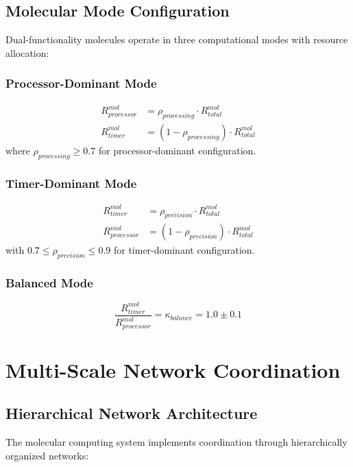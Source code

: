 \documentclass[12pt,a4paper]{article}
\begin{document}
\subsection{Molecular Mode Configuration}

Dual-functionality molecules operate in three computational modes with resource allocation:

\subsubsection{Processor-Dominant Mode}
\begin{align}
R_{processor}^{mol} &= \rho_{processing} \cdot R_{total}^{mol} \\
R_{timer}^{mol} &= (1 - \rho_{processing}) \cdot R_{total}^{mol}
\end{align}
where $\rho_{processing} \geq 0.7$ for processor-dominant configuration.

\subsubsection{Timer-Dominant Mode}
\begin{align}
R_{timer}^{mol} &= \rho_{precision} \cdot R_{total}^{mol} \\
R_{processor}^{mol} &= (1 - \rho_{precision}) \cdot R_{total}^{mol}
\end{align}
with $0.7 \leq \rho_{precision} \leq 0.9$ for timer-dominant configuration.

\subsubsection{Balanced Mode}
\begin{equation}
\frac{R_{timer}^{mol}}{R_{processor}^{mol}} = \kappa_{balance} = 1.0 \pm 0.1
\end{equation}

\section{Multi-Scale Network Coordination}

\subsection{Hierarchical Network Architecture}

The molecular computing system implements coordination through hierarchically organized networks:
\end{document}
